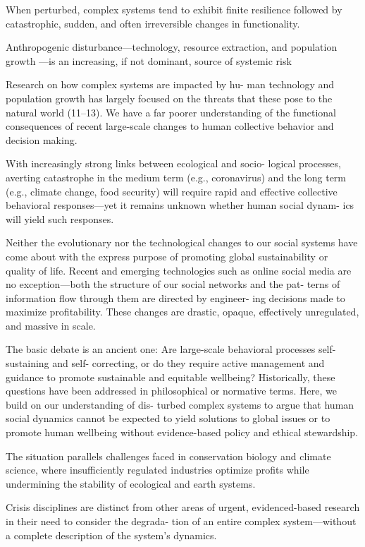 \documentclass[
]{book}
\begin{document}
When
perturbed, complex systems tend to exhibit finite
resilience followed by catastrophic, sudden, and often irreversible
changes in functionality.

Anthropogenic disturbance---technology, resource extraction, and population growth
---is an increasing, if not dominant, source of systemic risk

Research on how complex systems are impacted by hu-
man technology and population growth has largely focused on
the threats that these pose to the natural world (11--13). We have a
far poorer understanding of the functional consequences of recent
large-scale changes to human collective behavior and decision making.

With increasingly strong links between ecological and socio-
logical processes, averting catastrophe in the medium term (e.g.,
coronavirus) and the long term (e.g., climate change, food
security) will require rapid and effective collective behavioral
responses---yet it remains unknown whether human social dynam-
ics will yield such responses.

Neither the evolutionary nor the technological changes to our
social systems have come about with the express purpose of
promoting global sustainability or quality of life. Recent and
emerging technologies such as online social media are no
exception---both the structure of our social networks and the pat-
terns of information flow through them are directed by engineer-
ing decisions made to maximize profitability. These changes are
drastic, opaque, effectively unregulated, and massive in scale.

The basic debate is an ancient one:
Are large-scale behavioral processes self-sustaining and self-
correcting, or do they require active management and guidance
to promote sustainable and equitable wellbeing?
Historically, these questions have been addressed in philosophical or
normative terms. Here, we build on our understanding of dis-
turbed complex systems to argue that human social dynamics
cannot be expected to yield solutions to global issues or to promote
human wellbeing without evidence-based policy and ethical stewardship.

The situation parallels challenges faced in conservation biology
and climate science, where insufficiently regulated industries
optimize profits while undermining the stability of ecological and
earth systems.

Crisis disciplines are distinct from other areas of urgent,
evidenced-based research in their need to consider the degrada-
tion of an entire complex system---without a complete description
of the system's dynamics.
\end{document}
